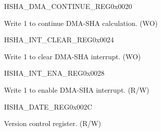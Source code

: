 \begin{register}{H}{SHA\_DMA\_CONTINUE\_REG}{0x0020}\label{regdesc:SHADMACONTINUEREG}
%
%
\regnewline%
\begin{regdesc}\begin{reglist}
\label{fielddesc:SHADMACONTINUE}\item [SHA\_DMA\_CONTINUE] Write 1 to continue DMA-SHA calculation. (WO)
\end{reglist}\end{regdesc}
\end{register}


\begin{register}{H}{SHA\_INT\_CLEAR\_REG}{0x0024}\label{regdesc:SHAINTCLEARREG}
%
%
\regnewline%
\begin{regdesc}\begin{reglist}
\label{fielddesc:SHACLEARINTERRUPT}\item [SHA\_CLEAR\_INTERRUPT] Write 1 to clear DMA-SHA interrupt. (WO)
\end{reglist}\end{regdesc}
\end{register}


\begin{register}{H}{SHA\_INT\_ENA\_REG}{0x0028}\label{regdesc:SHAINTENAREG}
%
%
\regnewline%
\begin{regdesc}\begin{reglist}
\label{fielddesc:SHAINTERRUPTENA}\item [SHA\_INTERRUPT\_ENA] Write 1 to enable DMA-SHA interrupt. (R/W)
\end{reglist}\end{regdesc}
\end{register}


\begin{register}{H}{SHA\_DATE\_REG}{0x002C}\label{regdesc:SHADATEREG}
%
%
\regnewline%
\begin{regdesc}\begin{reglist}
\label{fielddesc:SHADATE}\item [SHA\_DATE] Version control register. (R/W)
\end{reglist}\end{regdesc}
\end{register}


